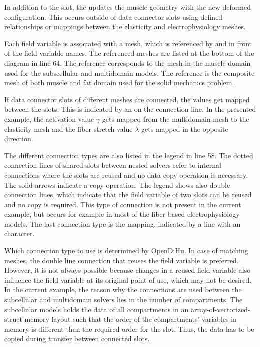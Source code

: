 In addition to the  slot, the  updates the muscle geometry with the new deformed configuration. This occurs outside of data connector slots using defined relationships or mappings between the elasticity and electrophysiology meshes.

Each field variable is associated with a mesh, which is referenced by \code{[a]} and \code{[b]} in front of the field variable names. The referenced meshes are listed at the bottom of the diagram in line 64. The reference \code{[a]} corresponds to the mesh in the muscle domain used for the subscellular and multidomain models. The reference \code{[b]} is the composite mesh of both muscle and fat domain used for the solid mechanics problem. 

If data connector slots of different meshes are connected, the values get mapped between the slots. This is indicated by an  on the connection line. In the presented example, the activation value $\gamma$ gets mapped from the multidomain mesh \code{[a]} to the elasticity mesh \code{[b]} and the fiber stretch value $\lambda$ gets mapped in the opposite direction.

The different connection types are also listed in the legend in line 58. The dotted connection lines of shared slots between nested solvers refer to internal connections where the slots are reused and no data copy operation is necessary. The solid arrows indicate a copy operation. The legend shows also double connection lines, which indicate that the field variable of two slots can be reused and no copy is required. This type of connection is not present in the current example, but occurs for example in most of the fiber based electrophysiology models. The last connection type is the mapping, indicated by a line with an  character.

Which connection type to use is determined by OpenDiHu. In case of matching meshes, the double line connection that reuses the field variable is preferred. However, it is not always possible because changes in a reused field variable also influence the field variable at its original point of use, which may not be desired. In the current example, the reason why the  connections are used between the subcellular and multidomain solvers lies in the number of compartments. The subcellular models holds the data of all compartments in an array-of-vectorized-struct memory layout such that the order of the compartments' variables in memory is different than the required order for the slot. Thus, the data has to be copied during transfer between connected slots.

